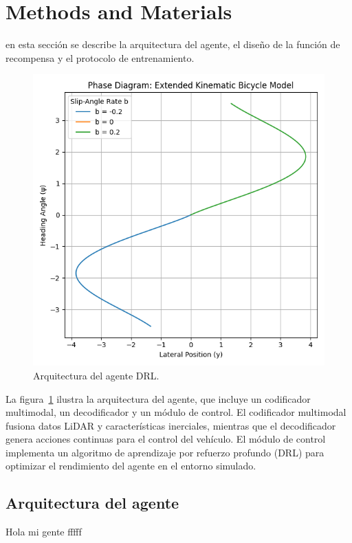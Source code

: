 \section{Methods and Materials}
\label{sec:methods} 
en esta sección se describe la arquitectura del agente, el diseño de la función de recompensa y el protocolo de entrenamiento.
\begin{figure}[h]
    \centering
    \includegraphics[width=0.8\linewidth]{images/bicylce_model1.png}
    \caption{Arquitectura del agente DRL.}
    \label{fig:arch} 
\end{figure}
La figura~\ref{fig:arch} ilustra la arquitectura del agente, que incluye un codificador multimodal, un decodificador y un módulo de control. El codificador multimodal fusiona datos LiDAR y características inerciales, mientras que el decodificador genera acciones continuas para el control del vehículo. El módulo de control implementa un algoritmo de aprendizaje por refuerzo profundo (DRL) para optimizar el rendimiento del agente en el entorno simulado.
\subsection{Arquitectura del agente}
Hola mi gente fffff

